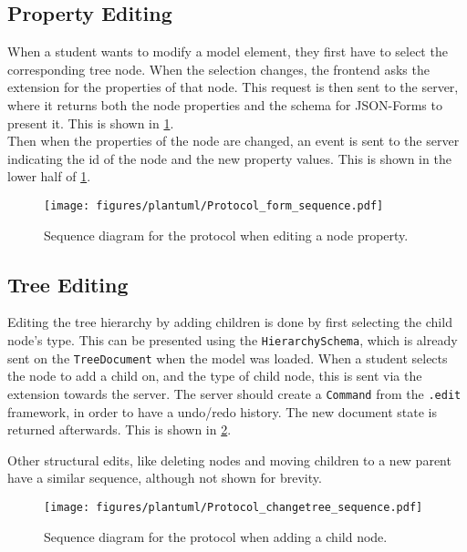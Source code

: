 \subsection{Property Editing}

When a student wants to modify a model element, they first have to select the corresponding tree node.
When the selection changes, the frontend asks the extension for the properties of that node.
This request is then sent to the server, where it returns both the node properties and the schema for JSON-Forms to present it.
This is shown in \cref{fig:protocol-form}.\\

Then when the properties of the node are changed, an event is sent to the server indicating the id of the node and the new property values.
This is shown in the lower half of \cref{fig:protocol-form}.

\begin{figure}[htbp]  %
  \centering
  \texttt{[image: figures/plantuml/Protocol\_form\_sequence.pdf]}
  \caption[Protocol Sequence Diagram of Property Form]{Sequence diagram for the protocol when editing a node property. \bluearrowDesc}\label{fig:protocol-form}
\end{figure}

\FloatBarrier

\subsection{Tree Editing}

Editing the tree hierarchy by adding children is done by first selecting the child node's type.
This can be presented using the \texttt{HierarchySchema}, which is already sent on the \texttt{TreeDocument} when the model was loaded.
When a student selects the node to add a child on, and the type of child node, this is sent via the extension towards the server.
The server should create a \texttt{Command} from the \texttt{.edit} framework, in order to have a undo/redo history.
The new document state is returned afterwards.
This is shown in \cref{fig:protocol-changetree}.

Other structural edits, like deleting nodes and moving children to a new parent have a similar sequence, although not shown for brevity.

\begin{figure}[htbp]  %
  \centering
  \texttt{[image: figures/plantuml/Protocol\_changetree\_sequence.pdf]}
  \caption[Protocol Sequence Diagram of Tree Changes]{Sequence diagram for the protocol when adding a child node. \bluearrowDesc}\label{fig:protocol-changetree}
\end{figure}


\FloatBarrier
